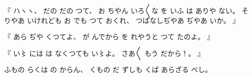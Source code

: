 %
『
ハヽヽ、
%
だの
だの
つて、
%
お
ちやん
いろ〳〵な
を
いふ
は
ありや
ない。
%
そりやあ
いけれども
お
でも
つて
おくれ、
%
つぱなしぢやあ
ぢやあ
いか。
』

%
『
あら
ぢや
くつてよ、
%
が
んでから
を
れやうと%
つて
たのよ。
』

%
『
い〻{}%
には
は
なくつても
い〻よ。%
%
さあ〳〵
もう
だから！。
』

%
ふもの
らくは
の
からん、
%
くもの
だ
ずしも
くば
あらざる
べし。
